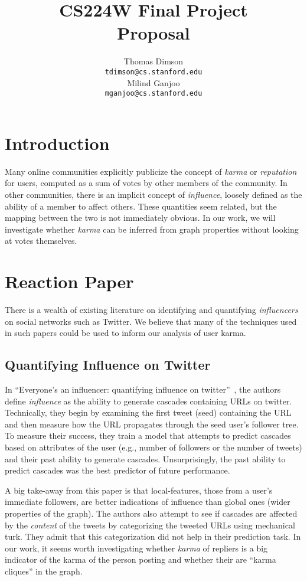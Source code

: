 \documentclass[11pt]{article}
\title{{\small CS224W Final Project} \\ Proposal}
\author{Thomas Dimson \\
  {\tt tdimson@cs.stanford.edu}
  \\\And
  Milind Ganjoo \\
  {\tt mganjoo@cs.stanford.edu}
}
\date{}
\newcommand{\titlecite}[2]{``#1''~\cite{#2}}
\begin{document}
\maketitle

\section{Introduction}
Many online communities explicitly publicize the concept of \textit{karma} or
\textit{reputation} for users, computed as a sum of votes 
by other members of the community. In other communities, there is an implicit concept
of \textit{influence}, loosely defined as the ability of a member to affect 
others. These quantities seem related, but the mapping between the two is not 
immediately obvious. In our work,
we will investigate whether \textit{karma} can be inferred from graph properties without
looking at votes themselves.

\section{Reaction Paper}
There is a wealth of existing literature on identifying and quantifying \textit{influencers}
on social networks such as Twitter. We believe that many of the techniques used in such papers
could be used to inform our analysis of user karma.

\subsection{Quantifying Influence on Twitter}
In \titlecite{Everyone's an influencer: quantifying influence on twitter}{bakshy2011everyone}, 
the authors define \textit{influence} as the ability to generate cascades containing
URLs on twitter. Technically, they begin by examining the first tweet (seed) containing the URL and
then measure how the URL propagates through the seed user's follower tree. To measure their
success, they train a model that attempts to predict cascades based on attributes of the user
(e.g., number of followers or the number of tweets) and their past ability to generate cascades.
Unsurprisingly, the past ability to predict cascades was the best predictor of future performance.

A big take-away from this paper is that local-features, those from a user's immediate followers,
are better indications of influence than global ones (wider properties of the graph). The authors
also attempt to see if cascades are affected by the \textit{content} of the tweets by categorizing the 
tweeted URLs using mechanical turk. They admit that this categorization did not help in their
prediction task. In our work,
it seems worth investigating whether \textit{karma} of repliers is a big indicator of the karma
of the person posting and whether their are ``karma cliques'' in the graph. 
\end{document}
